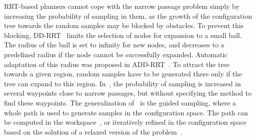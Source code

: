 \documentclass[usletter, 10pt, conference]{ieeeconf} %
\def\C{\mathcal{C}}
\begin{document}
{%

RRT-based planners cannot cope with the narrow passage problem simply by increasing the probability of sampling in them, as the
growth of the configuration tree towards the random samples may be blocked by obstacles. %
To prevent this blocking, DD-RRT~\cite{yershovaDDRRT} limits the selection of nodes for expansion to a small ball. 
The radius of the ball is set to infinity for new nodes, and decreases to a predefined radius if the node cannot be successfully expanded.
Automatic adaptation of this radius was proposed in ADD-RRT~\cite{jailletADRRT}.
To attract the tree towards a given region, random samples have to be generated there only if the tree can expand to this region.
In~\cite{kardossRRTKK}, the probability of sampling is increased in several waypoints close to narrow passages, but without specifying
the method to find these waypoints.
The generalization of~\cite{kardossRRTKK} is the guided sampling, where a whole path is used
to generate samples in the configuration space.
The path can be computed in the workspace~\cite{vonasek2009rrt}, or iteratively refined in the configuration space based on the solution of a relaxed version of the problem~\cite{bayazitIRC}.

}
\end{document}
